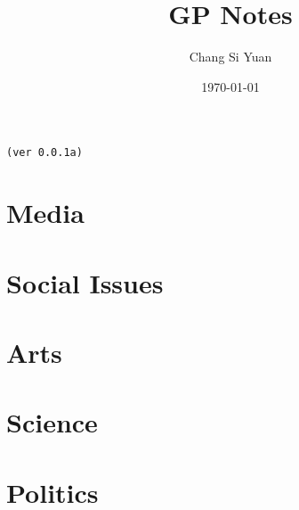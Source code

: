 \documentclass[a4paper]{article}
\author{Chang Si Yuan}
\title{GP Notes}
\date{\today}
\begin{document}
\maketitle
\begin{center} \tt (ver 0.0.1a) \end{center}

\begin{multicols}{2}

\section{Media}





\section{Social Issues}










\section{Arts}



\section{Science}






\section{Politics}





\end{multicols}
\end{document}
